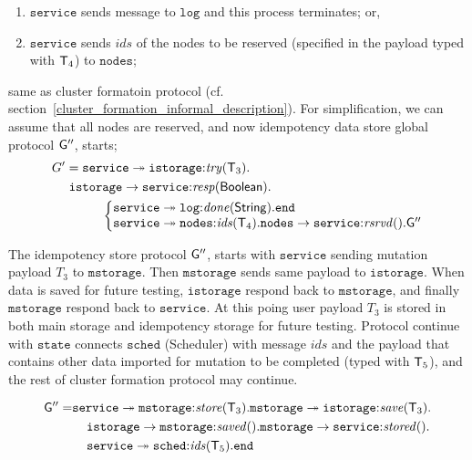 \begin{enumerate}[start=1,label={(\bfseries \arabic*)}]
\item $\mathtt{service}$ sends message to $\mathtt{log}$ and this process terminates; or,
\item $\mathtt{service}$ sends $\mathit{ids}$ of the nodes to be reserved (specified in the payload typed with ${\mathsf T}_4$) to $\mathtt{nodes}$;
\end{enumerate}

\noindent
same as cluster formatoin protocol (cf. section~\ref{cluster_formation_informal_description}). For simplification, we can assume that all nodes are reserved, and now idempotency data store global protocol ${\sf G}''$, starts;
\begin{align*}
G' & = 
\mathtt{service} \twoheadrightarrow \mathtt{istorage}{:}\mathit{try}(\T_3). \\
& \hspace{1mm}
\mathtt{istorage} \to \mathtt{service}{:}\mathit{resp}(\mathsf{Boolean}).\\
& \hspace{10mm}
\left\{
\begin{array}{@{}l@{}}
\mathtt{service} \twoheadrightarrow\mathtt{log}{:} \mathit{done}(\mathsf{String}).\tend\\
\mathtt{service} \twoheadrightarrow\mathtt{nodes}{:}\mathit{ids}(\T_4).
\mathtt{nodes} \to \mathtt{service}{:}\mathit{rsrvd}().\G''
\end{array} \right.
\end{align*}

The idempotency store protocol ${\sf G}''$, starts with $\mathtt{service}$ sending mutation payload $T_3$ to $\mathtt{mstorage}$. Then $\mathtt{mstorage}$ sends same payload to $\mathtt{istorage}$. When data is saved for future testing, $\mathtt{istorage}$ respond back to $\mathtt{mstorage}$, and finally $\mathtt{mstorage}$ respond back to $\mathtt{service}$. At this poing user payload $T_3$ is stored in both main storage and idempotency storage for future testing. Protocol continue with $\mathtt{state}$ connects $\mathtt{sched}$ (Scheduler) with message $\mathit{ids}$ and the payload that contains other data imported for mutation to be completed (typed with ${\mathsf T}_5$), and the rest of cluster formation protocol may continue.

\begin{align*}
{\sf G}'' = & 
\mathtt{service} \twoheadrightarrow \mathtt{mstorage}{:}\mathit{store}({\mathsf T}_3).
\mathtt{mstorage} \twoheadrightarrow \mathtt{istorage}{:}\mathit{save}({\mathsf T}_3).\\
& \hspace{4mm}
\mathtt{istorage} \to \mathtt{mstorage}{:}\mathit{saved}().
\mathtt{mstorage} \to \mathtt{service}{:}\mathit{stored}().\\
& \hspace{4mm}
\mathtt{service} \twoheadrightarrow \mathtt{sched}{:}\mathit{ids}({\mathsf T}_5).\mathtt{end}
\end{align*}

